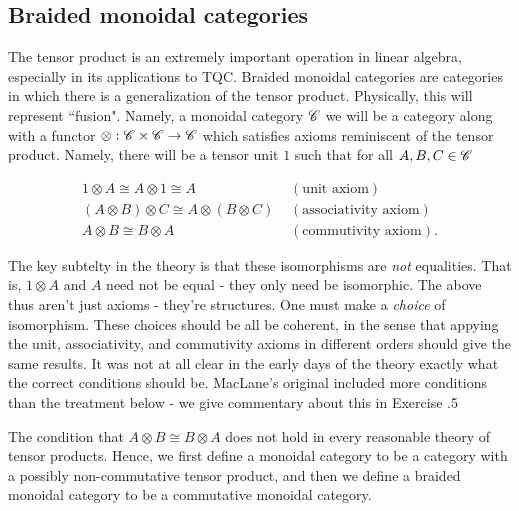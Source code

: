 \documentclass{article}
\theoremstyle{definition}
\numberwithin{figure}{section}
\begin{document}
\subsection{Braided monoidal categories}
\label{Braided monoidal categories}

The tensor product is an extremely important operation in linear algebra, especially in its applications to TQC. Braided monoidal categories are categories in which there is a generalization of the tensor product. Physically, this will represent ``fusion". Namely, a monoidal category $\mathscr{C}$ we will be a category along with a functor $\otimes : \mathscr{C}\times \mathscr{C}\to \mathscr{C}$ which satisfies axioms reminiscent of the tensor product. Namely, there will be a tensor unit $1$ such that for all $A,B,C\in \mathscr{C}$

\begin{align*}
1\otimes A\cong A\otimes 1\cong A \,\, &(\text{unit axiom})\\
(A\otimes B)\otimes C \cong A\otimes (B\otimes C)\,\, &(\text{associativity axiom})\\
A\otimes B \cong B\otimes A\,\, &(\text{commutivity axiom}).
\end{align*}

The key subtelty in the theory is that these isomorphisms are \textit{not} equalities. That is, $1\otimes A$ and $A$ need not be equal - they only need be isomorphic. The above thus aren't just axioms - they're structures. One must make a \textit{choice} of isomorphism. These choices should be all be coherent, in the sense that appying the unit, associativity, and commutivity axioms in different orders should give the same results. It was not at all clear in the early days of the theory exactly what the correct conditions should be. MacLane's original included more conditions than the treatment below - we give commentary about this in Exercise \thesection.5

The condition that $A\otimes B\cong B\otimes A$ does not hold in every reasonable theory of tensor products. Hence, we first define a monoidal category to be a category with a possibly non-commutative tensor product, and then we define a braided monoidal category to be a commutative monoidal category.
\end{document}
